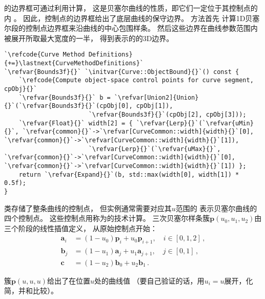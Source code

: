 的边界框可通过利用计算，
这是贝塞尔曲线的性质，即它们一定位于其控制点的内
。
因此，控制点的边界框给出了底层曲线的保守边界。
方法首先
计算1D贝塞尔段的控制点边界框来沿曲线的中心包围样条。
然后这些边界在曲线参数范围内被展开所取最大宽度的一半，
得到表示的的3D边界。
\begin{lstlisting}
`\refcode{Curve Method Definitions}{+=}\lastnext{CurveMethodDefinitions}`
`\refvar{Bounds3f}{}` `\initvar{Curve::ObjectBound}{}`() const {
    `\refcode{Compute object-space control points for curve segment, cpObj}{}`
    `\refvar{Bounds3f}{}` b = `\refvar[Union2]{Union}{}`(`\refvar{Bounds3f}{}`(cpObj[0], cpObj[1]),
                       `\refvar{Bounds3f}{}`(cpObj[2], cpObj[3]));
    `\refvar{Float}{}` width[2] = { `\refvar{Lerp}{}`(`\refvar{uMin}{}`, `\refvar{common}{}`->`\refvar[CurveCommon::width]{width}{}`[0], `\refvar{common}{}`->`\refvar[CurveCommon::width]{width}{}`[1]),
                       `\refvar{Lerp}{}`(`\refvar{uMax}{}`, `\refvar{common}{}`->`\refvar[CurveCommon::width]{width}{}`[0], `\refvar{common}{}`->`\refvar[CurveCommon::width]{width}{}`[1]) };
    return `\refvar{Expand}{}`(b, std::max(width[0], width[1]) * 0.5f);
}
\end{lstlisting}

类存储了整条曲线的控制点，
但实例通常需要对应其$u$范围的
表示贝塞尔曲线的四个控制点。
这些控制点用称为的技术计算。
三次贝塞尔样条簇$\bm p(u_0,u_1,u_2)$由三个阶段的线性插值定义，
从原始控制点开始：
\begin{align}\label{eq:3.4}
    \bm a_i & =(1-u_0)\bm p_i+u_0\bm p_{i+1},\quad i\in[0,1,2]\nonumber\, , \\
    \bm b_j & =(1-u_1)\bm a_j+u_1\bm a_{j+1},\quad j\in[0,1]\nonumber\, ,   \\
    \bm c   & =(1-u_2)\bm b_0+u_2\bm b_1\, .
\end{align}

簇$\bm p(u,u,u)$给出了在位置$u$处的曲线值
（要自己验证的话，用$u_i=u$展开，化简，并和比较）。

